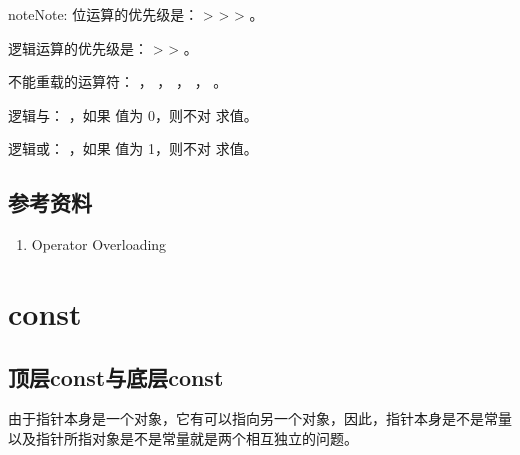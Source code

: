 \documentclass[letterpaper,10pt,english]{sphinxmanual}
\begin{document}
\begin{sphinxadmonition}{note}{Note:}
位运算的优先级是：\sphinxcode{\sphinxupquote{\textasciitilde{}}} \textgreater{} \sphinxcode{\sphinxupquote{\&}} \textgreater{} \sphinxcode{\sphinxupquote{\textasciicircum{}}} \textgreater{} \sphinxcode{\sphinxupquote{\textbar{}}} 。

逻辑运算的优先级是：\sphinxcode{\sphinxupquote{!}} \textgreater{} \sphinxcode{\sphinxupquote{\&\&}} \textgreater{} \sphinxcode{\sphinxupquote{\textbar{}\textbar{}}} 。

不能重载的运算符： ， ， ， ， \sphinxcode{\sphinxupquote{::}}。

逻辑与： ，如果  值为 0，则不对  求值。

逻辑或： ，如果  值为 1，则不对  求值。
\end{sphinxadmonition}


\subsection{参考资料}
\label{\detokenize{cpp/21_operatorPrior:id2}}\begin{enumerate}
\item {} 
Operator Overloading

\end{enumerate}
\begin{quote}

\end{quote}


\section{const}
\label{\detokenize{cpp/22_const:const}}\label{\detokenize{cpp/22_const::doc}}

\subsection{顶层const与底层const}
\label{\detokenize{cpp/22_const:constconst}}
由于指针本身是一个对象，它有可以指向另一个对象，因此，指针本身是不是常量以及指针所指对象是不是常量就是两个相互独立的问题。
\end{document}
